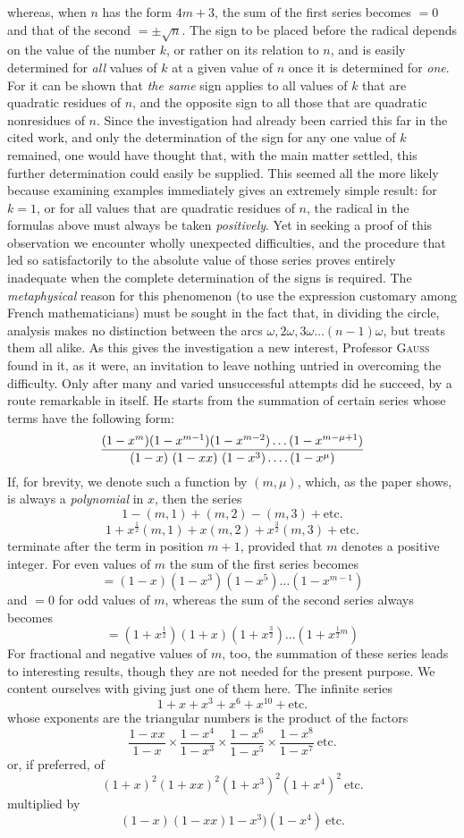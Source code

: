 whereas, when $n$ has the form $4m+3$, the sum of the first series becomes $=0$ and that of the second $=\pm\surd n$. The sign to be placed before the radical depends on the value of the number $k$, or rather on its relation to $n$, and is easily determined for \emph{all} values of $k$ at a given value of $n$ once it is determined for \emph{one}. For it can be shown that \emph{the same} sign applies to all values of $k$ that are quadratic residues of $n$, and the opposite sign to all those that are quadratic nonresidues of $n$. Since the investigation had already been carried this far in the cited work, and only the determination of the sign for any one value of $k$ remained, one would have thought that, with the main matter settled, this further determination could easily be supplied. This seemed all the more likely because examining examples immediately gives an extremely simple result: for $k=1$, or for all values that are quadratic residues of $n$, the radical in the formulas above must always be taken \emph{positively}. Yet in seeking a proof of this observation we encounter wholly unexpected difficulties, and the procedure that led so satisfactorily to the absolute value of those series proves entirely inadequate when the complete determination of the signs is required. The \emph{metaphysical} reason for this phenomenon (to use the expression customary among French mathematicians) must be sought in the fact that, in dividing the circle, analysis makes no distinction between the arcs $\omega,2\omega,3\omega\ldots(n-1)\omega$, but treats them all alike. As this gives the investigation a new interest, Professor \textsc{Gauss} found in it, as it were, an invitation to leave nothing untried in overcoming the difficulty. Only after many and varied unsuccessful attempts did he succeed, by a route remarkable in itself. He starts from the summation of certain series whose terms have the following form:
\[
\frac{(1-x^m)(1-x^{m-1})(1-x^{m-2})\ldots(1-x^{m-\mu+1})}{(1-x)\ (1-xx)\ (1-x^3)\dotsfour(1-x^\mu)}
\]
If, for brevity, we denote such a function by $(m,\mu)$, which, as the paper shows, is always a \emph{polynomial} in $x$, then the series
%
\[
1-(m,1)+(m,2)-(m,3)+\text{etc.}
\]
\[
1+x^{\frac12}(m,1)+x(m,2)+x^{\frac32}(m,3)+\text{etc.}
\]
terminate after the term in position $m+1$, provided that $m$ denotes a positive integer. For even values of $m$ the sum of the first series becomes
\[
=(1-x)(1-x^3)(1-x^5)\ldots(1-x^{m-1})
\]
and $=0$ for odd values of $m$, whereas the sum of the second series always becomes
\[
=(1+x^{\frac12})(1+x)(1+x^{\frac32})\ldots(1+x^{\frac12m})
\]
For fractional and negative values of $m$, too, the summation of these series leads to interesting results, though they are not needed for the present purpose. We content ourselves with giving just one of them here. The infinite series
\[
1+x+x^3+x^6+x^{10}+\text{etc.}
\]
whose exponents are the triangular numbers is the product of the factors
\[
\frac{1-xx}{1-x}\times\frac{1-x^4}{1-x^3}\times\frac{1-x^6}{1-x^5}\times\frac{1-x^8}{1-x^7}\ \text{etc.}
\]
or, if preferred, of
\[
(1+x)^2(1+xx)^2(1+x^3)^2(1+x^4)^2\ \text{etc.}
\]
multiplied by
\[
(1-x)(1-xx)1-x^3)(1-x^4)\ \text{etc.}
\]

